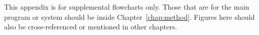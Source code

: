This appendix is for supplemental flowcharts only.
Those that are for the main program or system should be inside Chapter~\ref{chap:method}.
Figures here should also be cross-referenced or mentioned in other chapters.